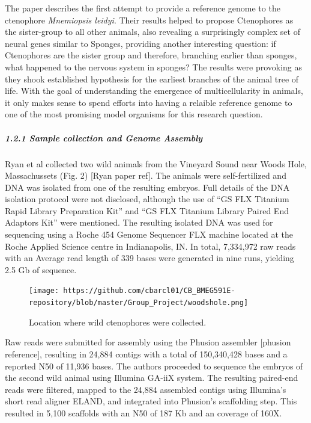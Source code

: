 \documentclass[
]{article}
\begin{document}
The paper describes the first attempt to provide a reference genome to
the ctenophore \emph{Mnemiopsis leidyi}. Their results helped to propose
Ctenophores as the sister-group to all other animals, also revealing a
surprisingly complex set of neural genes similar to Sponges, providing
another interesting question: if Ctenophores are the sister group and
therefore, branching earlier than sponges, what happened to the nervous
system in sponges? The results were provoking as they shook established
hypothesis for the earliest branches of the animal tree of life. With
the goal of understanding the emergence of multicellularity in animals,
it only makes sense to spend efforts into having a relaible reference
genome to one of the most promising model organisms for this research
question.

\hypertarget{sample-collection-and-genome-assembly-1}{%
\subparagraph{1.2.1 Sample collection and Genome
Assembly}\label{sample-collection-and-genome-assembly-1}}

Ryan et al collected two wild animals from the Vineyard Sound near Woods
Hole, Massachussets (Fig. 2) {[}Ryan paper ref{]}. The animals were
self-fertilized and DNA was isolated from one of the resulting embryos.
Full details of the DNA isolation protocol were not disclosed, although
the use of ``GS FLX Titanium Rapid Library Preparation Kit'' and ``GS
FLX Titanium Library Paired End Adaptors Kit'' were mentioned. The
resulting isolated DNA was used for sequencing using a Roche 454 Genome
Sequencer FLX machine located at the Roche Applied Science centre in
Indianapolis, IN. In total, 7,334,972 raw reads with an Average read
length of 339 bases were generated in nine runs, yielding 2.5 Gb of
sequence.

\begin{figure}
\centering
\texttt{[image: https://github.com/cbarcl01/CB\_BMEG591E-repository/blob/master/Group\_Project/woodshole.png]}
\caption{Location where wild ctenophores were collected.}
\end{figure}

Raw reads were submitted for assembly using the Phusion assembler
{[}phusion reference{]}, resulting in 24,884 contigs with a total of
150,340,428 bases and a reported N50 of 11,936 bases. The authors
proceeded to sequence the embryos of the second wild animal using
Illumina GA-iiX system. The resulting paired-end reads were filtered,
mapped to the 24,884 assembled contigs using Illumina's short read
aligner ELAND, and integrated into Phusion's scaffolding step. This
resulted in 5,100 scaffolds with an N50 of 187 Kb and an coverage of
160X.
\end{document}
